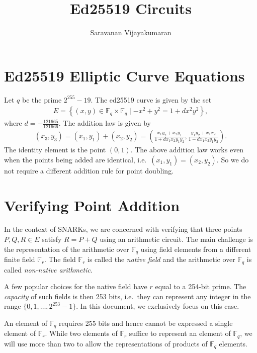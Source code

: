 \documentclass[a4paper, 12pt]{article}
\title{Ed25519 Circuits}
\author{Saravanan Vijayakumaran}
\begin{document}
\maketitle

\section{Ed25519 Elliptic Curve Equations}%
\label{sec:curve_equations}
Let $q$ be the prime $2^{255}-19$. The ed25519 curve is given by the set
\begin{align}
  E = \left\{ (x,y) \in \mathbb{F}_q \times \mathbb{F}_q \mid -x^2+y^2=1+dx^2y^2 \right\},
  \label{eqn:curve}
\end{align}
where $d = -\frac{121665}{121666}$. The addition law is given by
\begin{align}
  (x_3, y_3) = (x_1, y_1) + (x_2, y_2) = \left( \frac{x_1y_2+x_2y_1}{1+dx_1x_2y_1y_2}, \frac{y_1y_2 + x_1x_2}{1-dx_1x_2y_1y_2}  \right).
  \label{eqn:addition}
\end{align}
The identity element is the point $(0,1)$. The above addition law works even when the points being added are identical, i.e.~$(x_1, y_1) = (x_2, y_2)$. So we do not require a different addition rule for point doubling.

\section{Verifying Point Addition}%
\label{sec:verifying_point_addition}
In the context of SNARKs, we are concerned with verifying that three points $P, Q, R \in E$ satisfy $R= P+Q$ using an arithmetic circuit. The main challenge is the representation of the arithmetic over $\mathbb{F}_q$ using field elements from a different finite field $\mathbb{F}_r$. The field $\mathbb{F}_r$ is called the \textit{native field} and the arithmetic over $\mathbb{F}_q$ is called \textit{non-native arithmetic}.

A few popular choices for the native field have $r$ equal to a 254-bit prime. The \textit{capacity} of such fields is then 253 bits, i.e.~they can represent any integer in the range $\{0,1,\ldots,2^{253}-1\}$. In this document, we exclusively focus on this case.

An element of $\mathbb{F}_q$ requires 255 bits and hence cannot be expressed a single element of $\mathbb{F}_r$. While two elements of $\mathbb{F}_r$ suffice to represent an element of $\mathbb{F}_q$, we will use more than two to allow the representations of products of $\mathbb{F}_q$ elements.
\end{document}
